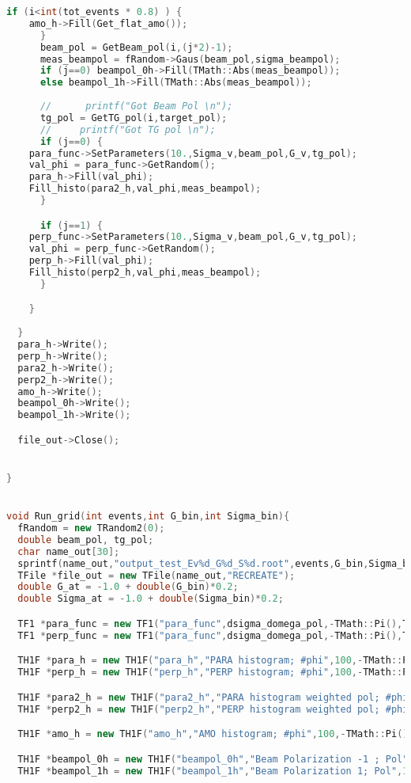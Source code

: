 \begin{lstlisting}[language=C++]
      if (i<int(tot_events * 0.8) ) {
	amo_h->Fill(Get_flat_amo());
      }
      beam_pol = GetBeam_pol(i,(j*2)-1);
      meas_beampol = fRandom->Gaus(beam_pol,sigma_beampol);
      if (j==0) beampol_0h->Fill(TMath::Abs(meas_beampol));
      else beampol_1h->Fill(TMath::Abs(meas_beampol));
   
      //      printf("Got Beam Pol \n");
      tg_pol = GetTG_pol(i,target_pol);
      //     printf("Got TG pol \n");
      if (j==0) {
	para_func->SetParameters(10.,Sigma_v,beam_pol,G_v,tg_pol);
	val_phi = para_func->GetRandom();
	para_h->Fill(val_phi);
	Fill_histo(para2_h,val_phi,meas_beampol);
      }

      if (j==1) {
	perp_func->SetParameters(10.,Sigma_v,beam_pol,G_v,tg_pol);
	val_phi = perp_func->GetRandom();
	perp_h->Fill(val_phi);
	Fill_histo(perp2_h,val_phi,meas_beampol);
      }

    }
    
  }
  para_h->Write();
  perp_h->Write();
  para2_h->Write();
  perp2_h->Write();
  amo_h->Write();
  beampol_0h->Write();
  beampol_1h->Write();

  file_out->Close();


}


void Run_grid(int events,int G_bin,int Sigma_bin){
  fRandom = new TRandom2(0);
  double beam_pol, tg_pol;
  char name_out[30];
  sprintf(name_out,"output_test_Ev%d_G%d_S%d.root",events,G_bin,Sigma_bin);
  TFile *file_out = new TFile(name_out,"RECREATE");
  double G_at = -1.0 + double(G_bin)*0.2;
  double Sigma_at = -1.0 + double(Sigma_bin)*0.2;

  TF1 *para_func = new TF1("para_func",dsigma_domega_pol,-TMath::Pi(),TMath::Pi(),5);
  TF1 *perp_func = new TF1("para_func",dsigma_domega_pol,-TMath::Pi(),TMath::Pi(),5);

  TH1F *para_h = new TH1F("para_h","PARA histogram; #phi",100,-TMath::Pi(),TMath::Pi());
  TH1F *perp_h = new TH1F("perp_h","PERP histogram; #phi",100,-TMath::Pi(),TMath::Pi());

  TH1F *para2_h = new TH1F("para2_h","PARA histogram weighted pol; #phi",100,-TMath::Pi(),TMath::Pi());
  TH1F *perp2_h = new TH1F("perp2_h","PERP histogram weighted pol; #phi",100,-TMath::Pi(),TMath::Pi());

  TH1F *amo_h = new TH1F("amo_h","AMO histogram; #phi",100,-TMath::Pi(),TMath::Pi());

  TH1F *beampol_0h = new TH1F("beampol_0h","Beam Polarization -1 ; Pol",100,0.,1.0);
  TH1F *beampol_1h = new TH1F("beampol_1h","Beam Polarization 1; Pol",100,0.,1.0);


\end{lstlisting}

